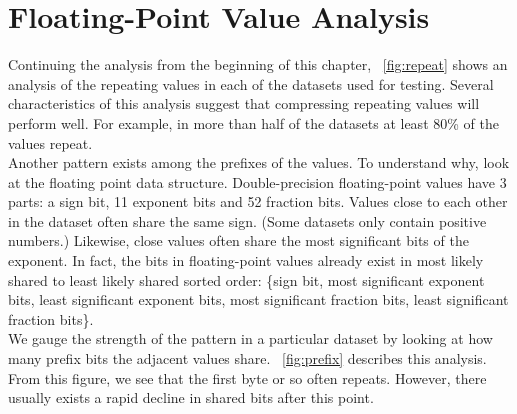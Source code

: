 \section{Floating-Point Value Analysis}
\label{sec:fzipanalysis}
Continuing the analysis from the beginning of this chapter, \figurename~\ref{fig:repeat} shows an analysis of the repeating values in each of the datasets used for testing. Several characteristics of this analysis suggest that compressing repeating values will perform well. For example, in more than half of the datasets at least 80\% of the values repeat.\\
\indent
Another pattern exists among the prefixes of the values. To understand why, look at the floating point data structure. Double-precision floating-point values have 3 parts: a sign bit, 11 exponent bits and 52 fraction bits. Values close to each other in the dataset often share the same sign. (Some datasets only contain positive numbers.) Likewise, close values often share the most significant bits of the exponent. In fact, the bits in floating-point values already exist in most likely shared to least likely shared sorted order: \{sign bit, most significant exponent bits, least significant exponent bits, most significant fraction bits, least significant fraction bits\}.\\
\indent We gauge the strength of the pattern in a particular dataset by looking at how many prefix bits the adjacent values share. \figurename~\ref{fig:prefix} describes this analysis. From this figure, we see that the first byte or so often repeats. However, there usually exists a rapid decline in shared bits after this point.\par
